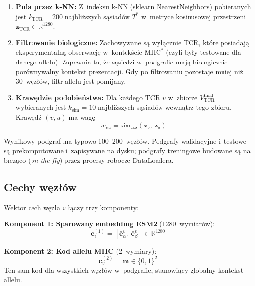 \documentclass{SGGW-thesis}
\begin{document}
\begin{enumerate}
  \item \textbf{Pula przez k-NN:} Z~indeksu k-NN (sklearn NearestNeighbors) pobieranych jest $k_{\mathrm{TCR}} = 200$
        najbliższych sąsiadów $T^*$ w~metryce kosinusowej przestrzeni $\mathbf{z}_{\mathrm{TCR}} \in \mathbb{R}^{1280}$.

  \item \textbf{Filtrowanie biologiczne:} Zachowywane są wyłącznie TCR, które posiadają
        eksperymentalną obserwację w~kontekście $\mathrm{MHC}^*$ (czyli były testowane dla danego allelu).
        Zapewnia to, że sąsiedzi w~podgrafie mają biologicznie porównywalny kontekst prezentacji.
        Gdy po filtrowaniu pozostaje mniej niż 30~węzłów, filtr allelu jest pomijany.

  \item \textbf{Krawędzie podobieństwa:} Dla każdego TCR $v$ w~zbiorze $V_{\mathrm{TCR}}^{\mathrm{final}}$
        wybieranych jest $k_{\mathrm{sim}} = 10$ najbliższych sąsiadów wewnątrz tego zbioru.
        Krawędź $(v, u)$ ma wagę:
        \begin{equation}
            w_{vu} = \mathrm{sim}_{\cos}\!\left(\mathbf{z}_v,\, \mathbf{z}_u\right)
            \label{eq:edge_weight}
        \end{equation}
\end{enumerate}

Wynikowy podgraf ma typowo 100--200~węzłów. Podgrafy walidacyjne i~testowe są prekomputowane i~zapisywane
na dysku; podgrafy treningowe budowane są na bieżąco (\textit{on-the-fly}) przez procesy robocze DataLoadera.

\subsection{Cechy węzłów}

Wektor cech węzła $v$ łączy trzy komponenty:

\textbf{Komponent 1: Sparowany embedding ESM2} (1280~wymiarów):
\begin{equation}
    \mathbf{c}_v^{(1)} = \left[\bar{\mathbf{e}}_\alpha^v;\; \bar{\mathbf{e}}_\beta^v\right] \in \mathbb{R}^{1280}
    \label{eq:gnn_feat1}
\end{equation}

\textbf{Komponent 2: Kod allelu MHC} (2~wymiary):
\begin{equation}
    \mathbf{c}_v^{(2)} = \mathbf{m} \in \{0,1\}^2
    \label{eq:gnn_feat2}
\end{equation}
Ten sam kod dla wszystkich węzłów w~podgrafie, stanowiący globalny kontekst allelu.
\end{document}
